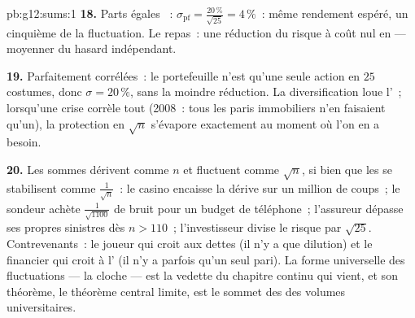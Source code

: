 \begin{solution}{pb:g12:sums:1}
\textbf{18.} Parts égales ~: $\sigma_{\text{pf}} =
\frac{20\,\%}{\sqrt{25}} = 4\,\%$~: même rendement espéré, un
cinquième de la fluctuation. Le repas~: une réduction du risque à
coût nul en  --- moyenner du hasard indépendant.

\textbf{19.} Parfaitement corrélées~: le portefeuille n'est qu'une
seule action en $25$ costumes, donc $\sigma = 20\,\%$, sans la
moindre réduction. La diversification loue l'\emph{}~;
lorsqu'une crise corrèle tout (2008~: tous les paris immobiliers
n'en faisaient qu'un), la protection en $\sqrt n$ s'évapore
exactement au moment où l'on en a besoin.

\textbf{20.} Les sommes dérivent comme $n$ et fluctuent comme
$\sqrt n$, si bien que les  se stabilisent comme
$\frac{1}{\sqrt n}$~: le casino encaisse la dérive sur un million
de coups~; le sondeur achète $\frac{1}{\sqrt{1100}}$ de bruit pour
un budget de téléphone~; l'assureur dépasse ses propres sinistres
dès $n > 110$~; l'investisseur divise le risque par $\sqrt{25}$.
Contrevenants~: le joueur qui croit aux dettes (il n'y a que
dilution) et le financier qui croit à l' (il n'y a
parfois qu'un seul pari). La forme universelle des fluctuations ---
la cloche --- est la vedette du chapitre continu qui vient, et son
théorème, le théorème central limite, est le sommet des
 des volumes universitaires.
\end{solution}
